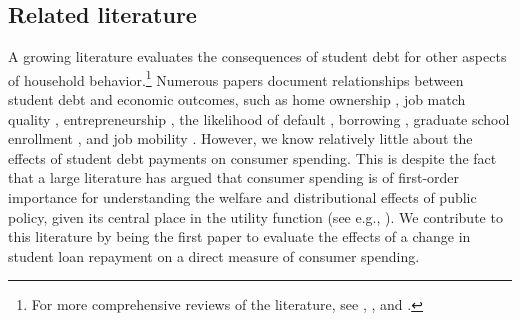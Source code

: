 \documentclass[12pt]{article}
\begin{document}
\subsection*{Related literature}
A growing literature evaluates the consequences of student debt for other aspects of household behavior.\footnote{For more comprehensive reviews of the literature, see \cite{amromin2016education}, \cite{lochner2016student}, and \cite{yannelis2022student}.} Numerous papers document relationships between student debt and economic outcomes, such as  home ownership \citep{mezza2020student}, job match quality \citep{field2009educational, rothstein2011constrained, luo2019assets}, entrepreneurship \citep{krishnan2019cost}, the likelihood of default \citep{armona2022student, mueller2019rise}, borrowing \citep{dinerstein2024debt}, graduate school enrollment \citep{chakrabarti2023tuition}, and job mobility \citep{jacob2024value}. However, we know relatively little about the effects of student debt payments on consumer spending. This is despite the fact that a large literature has argued that consumer spending is of first-order importance for understanding the welfare and distributional effects of public policy, given its central place in the utility function (see e.g., \citealp{blundell1998consumption, blundell2008consumption}). We contribute to this literature by being the first paper to evaluate the effects of a change in student loan repayment on a direct measure of consumer spending. 

\end{document}
